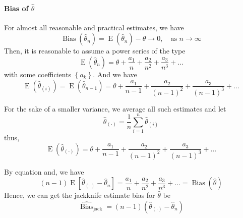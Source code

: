 \paragraph{Bias of $\hat{\theta}$}

For almost all reasonable and practical estimates, we have \begin{equation}
	\operatorname{Bias}(\hat{\theta}_{n})=\operatorname{E}(\hat{\theta}_{n})-\theta\rightarrow 0,\quad\text{as }n\rightarrow\infty
\end{equation}
Then, it is reasonable to assume a power series of the type
\begin{equation}
	\operatorname{E}(\hat{\theta}_{n})=\theta+\frac{a_{1}}{n}+\frac{a_{2}}{n^{2}}+\frac{a_{3}}{n^{3}}+\ldots
\end{equation}
with some coefficients $\left\{a_{k}\right\}$. And we have
\begin{equation}
	\operatorname{E}(\hat{\theta}_{(i)})=\operatorname{E}(\hat{\theta}_{n-1})=\theta+\frac{a_{1}}{n-1}+\frac{a_{2}}{\left(n-1\right)^{2}}+\frac{a_{3}}{\left(n-1\right)^{3}}+\ldots
\end{equation}

For the sake of a smaller variance, we average all such estimates and let
\begin{equation}
	\hat{\theta}_{(\cdot)}=\frac{1}{n}\sum_{i=1}^{n}\hat{\theta}_{(i)}
\end{equation}
thus,
\begin{equation}
	\operatorname{E}(\hat{\theta}_{(\cdot)})=\theta+\frac{a_{1}}{n-1}+\frac{a_{2}}{\left(n-1\right)^{2}}+\frac{a_{3}}{\left(n-1\right)^{3}}+\ldots
\end{equation}

By equation and, we have
\begin{equation}
	(n-1)\operatorname{E}\left[\hat{\theta}_{(\cdot)}-\hat{\theta}_{n}\right]=\frac{a_{1}}{n}+\frac{a_{2}}{n^{2}}+\frac{a_{3}}{n^{3}}+\ldots=\operatorname{Bias}(\hat{\theta})
\end{equation}
Hence, we can get the jackknife estimate bias for $\hat{\theta}$ be
\begin{equation}
	\widehat{\operatorname{Bias}}_{\text{jack}}=(n-1)\left(\hat{\theta}_{(\cdot)}-\hat{\theta}_{n}\right)
\end{equation}


